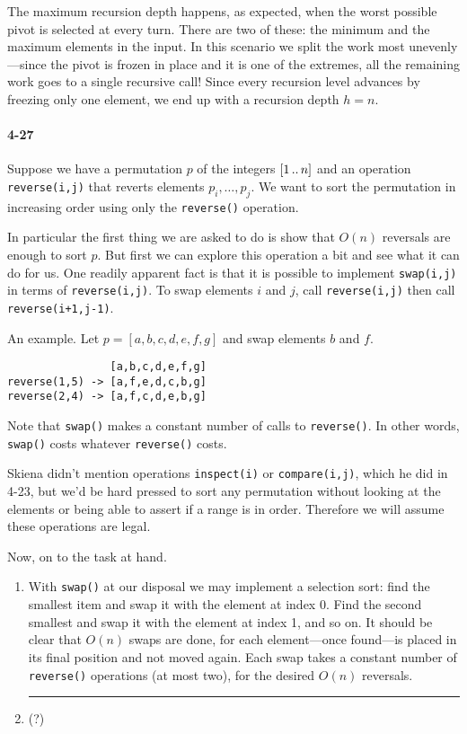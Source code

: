 \documentclass{report}
\newcommand{\ldotsTwo}{%
  \mathinner{{\ldotp}{\ldotp}}%
}
\newcommand{\okthen}{\rule[-1.4pt]{0.3em}{0.77em}}
\newcommand{\li}{\lstinline}
\begin{document}
The maximum recursion depth happens, as expected, when the worst possible pivot is selected at every turn. There are two of these: the minimum and the maximum elements in the input. In this scenario we split the work most unevenly---since the pivot is frozen in place and it is one of the extremes, all the remaining work goes to a single recursive call! Since every recursion level advances by freezing only one element, we end up with a recursion depth $h=n$.

\paragraph{4-27} Suppose we have a permutation $p$ of the integers $[1\ldotsTwo n]$ and an operation \li!reverse(i,j)! that reverts elements $p_i,\ldots,p_j$. We want to sort the permutation in increasing order using only the \li!reverse()! operation.

In particular the first thing we are asked to do is show that $O(n)$ reversals are enough to sort $p$. But first we can explore this operation a bit and see what it can do for us. One readily apparent fact is that it is possible to implement \li!swap(i,j)! in terms of \li!reverse(i,j)!. To swap elements $i$ and $j$, call \li!reverse(i,j)! then call \li!reverse(i+1,j-1)!.

An example. Let $p=[a,b,c,d,e,f,g]$ and swap elements $b$ and $f$.
\begin{lstlisting}
                [a,b,c,d,e,f,g]
reverse(1,5) -> [a,f,e,d,c,b,g]
reverse(2,4) -> [a,f,c,d,e,b,g]
\end{lstlisting}

Note that \li!swap()! makes a constant number of calls to \li!reverse()!. In other words, \li!swap()! costs whatever \li!reverse()! costs.

\smallskip

Skiena didn't mention operations \li!inspect(i)! or \li!compare(i,j)!, which he did in 4-23, but we'd be hard pressed to sort any permutation without looking at the elements or being able to assert if a range is in order. Therefore we will assume these operations are legal.

\smallskip

Now, on to the task at hand.
\begin{enumerate}[label=(\alph*)]
\item With \li!swap()! at our disposal we may implement a selection sort: find the smallest item and swap it with the element at index 0. Find the second smallest and swap it with the element at index 1, and so on. It should be clear that $O(n)$ swaps are done, for each element---once found---is placed in its final position and not moved again. Each swap takes a constant number of \li!reverse()! operations (at most two), for the desired $O(n)$ reversals.\,\okthen
\item (?)
\end{enumerate}
\end{document}
